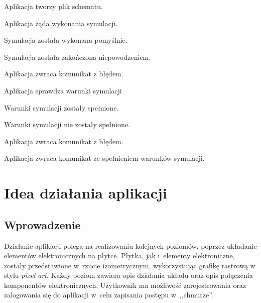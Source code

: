 \documentclass[12pt, a4paper]{article} %
\begin{document}
\hfill \break
\begin{usecase}
	\noaka
	\addpath
	\begin{usecases}
		\item Aplikacja tworzy plik schematu.
		\item Aplikacja żąda wykonania symulacji.
		\item Symulacja została wykonana pomyślnie.
		\begin{usecases}
			\item Symulacja została zakończona niepowodzeniem.
			\begin{usecases}
				\item Aplikacja zwraca komunikat z błędem.
			\end{usecases}
		\end{usecases}
		\item Aplikacja sprawdza warunki symulacji
		\item Warunki symulacji zostały spełnione.
		\begin{usecases}
			\item Warunki symulacji nie zostały spełnione.
			\begin{usecases}
				\item Aplikacja zwraca komunikat z błędem.
			\end{usecases}
		\end{usecases}
		\item Aplikacja zwraca komunikat ze spełnieniem warunków symulacji.
	\end{usecases}
\end{usecase}

\clearpage
\section{Idea działania aplikacji}
\subsection{Wprowadzenie}
\aka Działanie aplikacji polega na realizowaniu kolejnych poziomów, poprzez układanie elementów elektronicznych na płytce. Płytka, jak i~elementy elektroniczne, zostały przedstawione w~rzucie izometrycznym, wykorzystując grafikę rastrową w stylu \textit{pixel art}. Każdy poziom zawiera opis działania układu oraz opis połączenia komponentów elektronicznych. Użytkownik ma możliwość zarejestrowania oraz zalogowania się do aplikacji w~celu zapisania postępu  w~,,chmurze''.
\end{document}
